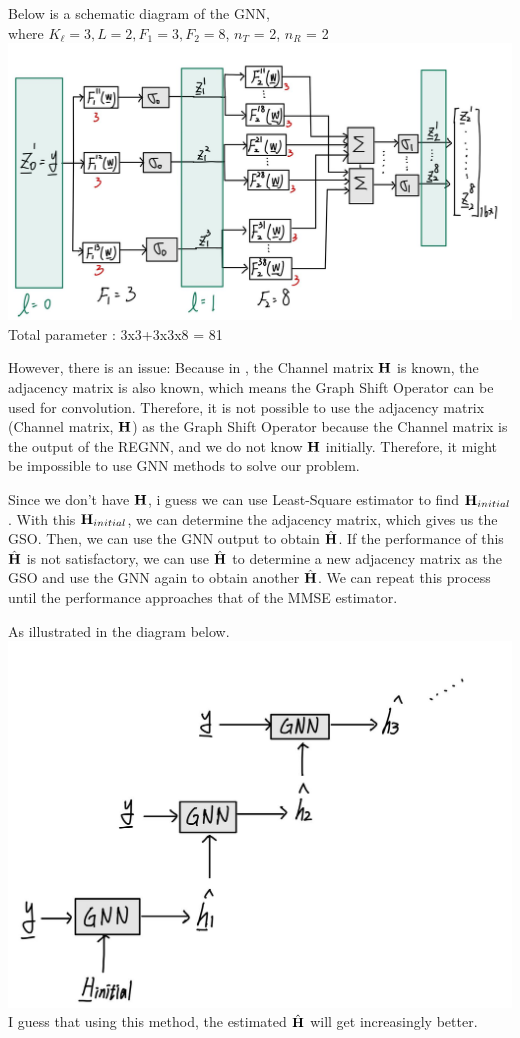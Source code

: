 \documentclass[journal,10pt,twocolumn]{IEEEtran}
\begin{document}
        Below is a schematic diagram of the GNN, \\where $K_{\ell} = 3, L = 2, F_{1} = 3, F_{2} = 8$, $n_{T}$ = 2, $n_{R}$ = 2\\
        \includegraphics[width=1.1\linewidth]{figures/REGNN_V2.jpg}
        Total parameter : 3x3+3x3x8 = 81

        However, there is an issue: Because in \cite{Eisen2020}, the Channel matrix ${\bf H}$
        is known, the adjacency matrix is also known, which means the Graph Shift Operator can be used for convolution. 
        Therefore, it is not possible to use the adjacency matrix (Channel matrix, 
        ${\bf H}$) as the Graph Shift Operator because the Channel matrix is the output of the REGNN, and we do not know 
        ${\bf H}$ initially. Therefore, it might be impossible to use GNN methods to solve our problem.

        Since we don't have ${\bf H}$, i guess we can use Least-Square estimator to find ${\bf H}_{initial}$. With this ${\bf H}_{initial}$,
        we can determine the adjacency matrix, which gives us the GSO. Then, we can use the GNN output to obtain $\hat{{\bf H}}$. 
        If the performance of this $\hat{{\bf H}}$ is not satisfactory, we can use $\hat{{\bf H}}$ to determine a new adjacency matrix as 
        the GSO and use the GNN again to obtain another $\hat{{\bf H}}$. We can repeat this process until the performance approaches that of the MMSE estimator.

        As illustrated in the diagram below.\\
        \includegraphics[width=.8\linewidth]{figures/Guess.jpg}\\
        I guess that using this method, the estimated $\hat{{\bf H}}$ will get increasingly better.
\end{document}
